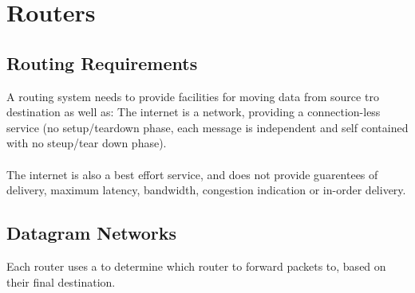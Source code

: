 \documentclass{report}
\begin{document}
    \section*{Routers}
        \subsection*{Routing Requirements}
            A routing system needs to provide facilities for moving data from source tro destination as well as:
            The internet is a  network, providing a connection-less service (no setup/teardown phase, each message is independent and self contained with no steup/tear down phase).
            \\
            \\ The internet is also a best effort service, and does not provide guarentees of delivery, maximum latency, bandwidth, congestion indication or in-order delivery.
        \subsection*{Datagram Networks}
            Each router uses a  to determine which router to forward packets to, based on their final destination.
\end{document}
